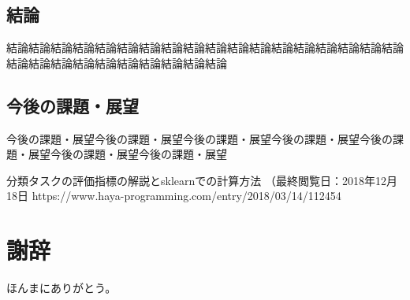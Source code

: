 \documentclass[11pt,a4j,uplatex]{jarticle}
\begin{document}
    \subsection{結論}
    結論結論結論結論結論結論結論結論結論結論結論結論結論結論結論結論結論結論結論結論結論結論結論結論結論結論結論結論
    \subsection{今後の課題・展望}
    今後の課題・展望今後の課題・展望今後の課題・展望今後の課題・展望今後の課題・展望今後の課題・展望今後の課題・展望


\newpage
\begin{thebibliography}{15}
    \bibitem{}分類タスクの評価指標の解説とsklearnでの計算方法 （最終閲覧日：2018年12月18日
    https://www.haya-programming.com/entry/2018/03/14/112454
\end{thebibliography}

\newpage
\section*{謝辞}
ほんまにありがとう。
\end{document}
